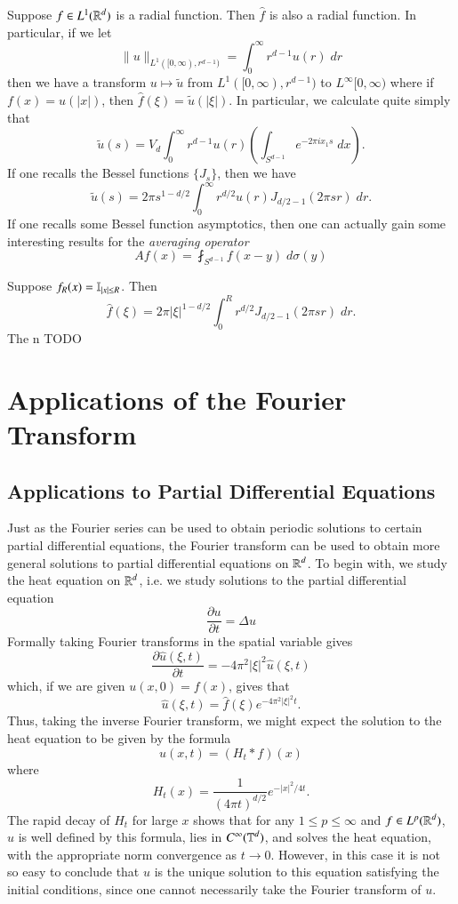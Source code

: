 Suppose $f \in L^1(\operatorname{\mathbb{R}}^d)$ is a radial function. Then $\widehat{f}$ is also a radial function. In particular, if we let
%
\[ \| u \|_{L^1([0,\infty), r^{d-1})} = \int_0^\infty r^{d-1} u(r)\; dr \]
%
then we have a transform $u \mapsto \tilde{u}$ from $L^1([0,\infty), r^{d-1})$ to $L^\infty[0,\infty)$ where if $f(x) = u(|x|)$, then $\widehat{f}(\xi) = \tilde{u}(|\xi|)$. In particular, we calculate quite simply that
%
\[ \tilde{u}(s) = V_d \int_0^\infty r^{d-1} u(r) \left( \int_{S^{d-1}} e^{-2 \pi i x_1 s}\; dx \right). \]
%
If one recalls the Bessel functions $\{ J_s \}$, then we have
%
\[ \tilde{u}(s) = 2\pi s^{1 - d/2} \int_0^\infty r^{d/2} u(r) J_{d/2-1}(2 \pi s r)\; dr. \]
%
If one recalls some Bessel function asymptotics, then one can actually gain some interesting results for the \emph{averaging operator}
%
\[ Af(x) = \fint_{S^{d-1}} f(x-y)\; d\sigma(y) \]
%

\begin{example}
    Suppose $f_R(x) = \operatorname{\mathbb{I}}_{|x| \leq R}$. Then
    \[ \widehat{f}(\xi) = 2 \pi |\xi|^{1-d/2} \int_0^R r^{d/2} J_{d/2-1}(2 \pi s r)\; dr. \]
    The n TODO
\end{example}



\chapter{Applications of the Fourier Transform}

\section{Applications to Partial Differential Equations}

Just as the Fourier series can be used to obtain periodic solutions to certain partial differential equations, the Fourier transform can be used to obtain more general solutions to partial differential equations on $\operatorname{\mathbb{R}}^d$. To begin with, we study the heat equation on $\operatorname{\mathbb{R}}^d$, i.e. we study solutions to the partial differential equation
%
\[ \frac{\partial u}{\partial t} = \Delta u \]
%
Formally taking Fourier transforms in the spatial variable gives
%
\[ \frac{\partial \widehat{u}(\xi,t)}{\partial t} = - 4 \pi^2 |\xi|^2 \widehat{u}(\xi,t) \]
%
which, if we are given $u(x,0) = f(x)$, gives that
%
\[ \widehat{u}(\xi,t) = \widehat{f}(\xi) e^{- 4 \pi^2 |\xi|^2 t}. \]
%
Thus, taking the inverse Fourier transform, we might expect the solution to the heat equation to be given by the formula
%
\[ u(x,t) = (H_t * f)(x) \]
%
where
%
\[ H_t(x) = \frac{1}{(4 \pi t)^{d/2}} e^{- |x|^2 / 4 t}. \]
%
The rapid decay of $H_t$ for large $x$ shows that for any $1 \leq p \leq \infty$ and $f \in L^p(\operatorname{\mathbb{R}}^d)$, $u$ is well defined by this formula, lies in $C^\infty(\operatorname{\mathbb{T}}^d)$, and solves the heat equation, with the appropriate norm convergence as $t \to 0$. However, in this case it is not so easy to conclude that $u$ is the unique solution to this equation satisfying the initial conditions, since one cannot necessarily take the Fourier transform of $u$.

